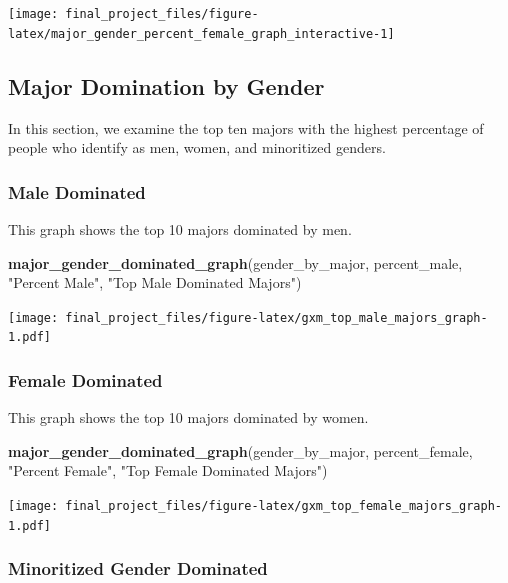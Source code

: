 \documentclass[
  twocolumn]{article}
\newenvironment{Shaded}{\begin{snugshade}}{\end{snugshade}}
\newcommand{\FunctionTok}[1]{\textcolor[rgb]{0.13,0.29,0.53}{\textbf{#1}}}
\newcommand{\NormalTok}[1]{#1}
\newcommand{\StringTok}[1]{\textcolor[rgb]{0.31,0.60,0.02}{#1}}
\begin{document}
\begin{center}\texttt{[image: final\_project\_files/figure-latex/major\_gender\_percent\_female\_graph\_interactive-1]} \end{center}

\subsection{Major Domination by
Gender}\label{major-domination-by-gender}

In this section, we examine the top ten majors with the highest
percentage of people who identify as men, women, and minoritized
genders.

\subsubsection{Male Dominated}\label{male-dominated}

This graph shows the top 10 majors dominated by men.

\begin{Shaded}
\begin{Highlighting}[]
\FunctionTok{major\_gender\_dominated\_graph}\NormalTok{(gender\_by\_major, percent\_male, }\StringTok{"Percent Male"}\NormalTok{, }\StringTok{"Top Male Dominated Majors"}\NormalTok{)}
\end{Highlighting}
\end{Shaded}

\texttt{[image: final\_project\_files/figure-latex/gxm\_top\_male\_majors\_graph-1.pdf]}

\subsubsection{Female Dominated}\label{female-dominated}

This graph shows the top 10 majors dominated by women.

\begin{Shaded}
\begin{Highlighting}[]
\FunctionTok{major\_gender\_dominated\_graph}\NormalTok{(gender\_by\_major, percent\_female, }\StringTok{"Percent Female"}\NormalTok{, }\StringTok{"Top Female Dominated Majors"}\NormalTok{)}
\end{Highlighting}
\end{Shaded}

\texttt{[image: final\_project\_files/figure-latex/gxm\_top\_female\_majors\_graph-1.pdf]}

\subsubsection{Minoritized Gender
Dominated}\label{minoritized-gender-dominated}
\end{document}
